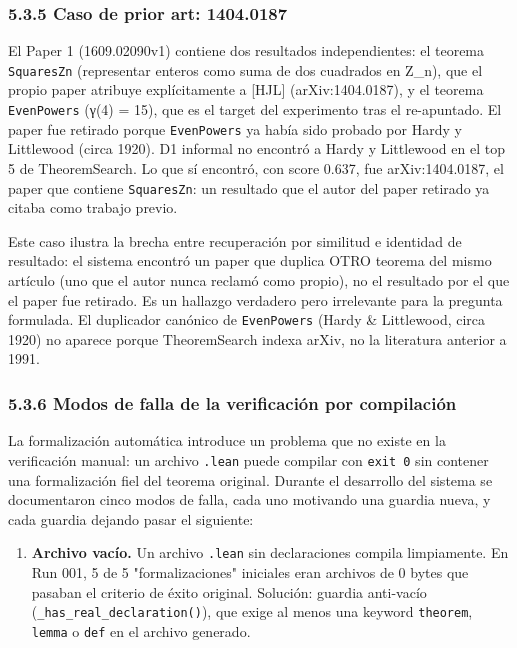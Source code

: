 \documentclass[12pt,a4paper]{article}
\theoremstyle{remark}
\begin{document}
\subsubsection{5.3.5 Caso de prior art: 1404.0187}

El Paper 1 (1609.02090v1) contiene dos resultados independientes: el teorema \texttt{SquaresZn} (representar enteros como suma de dos cuadrados en Z\_n), que el propio paper atribuye explícitamente a [HJL] (arXiv:1404.0187), y el teorema \texttt{EvenPowers} (γ(4) = 15), que es el target del experimento tras el re-apuntado. El paper fue retirado porque \texttt{EvenPowers} ya había sido probado por Hardy y Littlewood (circa 1920). D1 informal no encontró a Hardy y Littlewood en el top 5 de TheoremSearch. Lo que sí encontró, con score 0.637, fue arXiv:1404.0187, el paper que contiene \texttt{SquaresZn}: un resultado que el autor del paper retirado ya citaba como trabajo previo.


Este caso ilustra la brecha entre recuperación por similitud e identidad de resultado: el sistema encontró un paper que duplica OTRO teorema del mismo artículo (uno que el autor nunca reclamó como propio), no el resultado por el que el paper fue retirado. Es un hallazgo verdadero pero irrelevante para la pregunta formulada. El duplicador canónico de \texttt{EvenPowers} (Hardy \& Littlewood, circa 1920) no aparece porque TheoremSearch indexa arXiv, no la literatura anterior a 1991.

\subsubsection{5.3.6 Modos de falla de la verificación por compilación}

La formalización automática introduce un problema que no existe en la verificación manual: un archivo \texttt{.lean} puede compilar con \texttt{exit 0} sin contener una formalización fiel del teorema original. Durante el desarrollo del sistema se documentaron cinco modos de falla, cada uno motivando una guardia nueva, y cada guardia dejando pasar el siguiente:

\begin{enumerate}
\item \textbf{Archivo vacío.} Un archivo \texttt{.lean} sin declaraciones compila limpiamente. En Run 001, 5 de 5 "formalizaciones" iniciales eran archivos de 0 bytes que pasaban el criterio de éxito original. Solución: guardia anti-vacío (\texttt{\_has\_real\_declaration()}), que exige al menos una keyword \texttt{theorem}, \texttt{lemma} o \texttt{def} en el archivo generado.
\end{enumerate}
\end{document}
